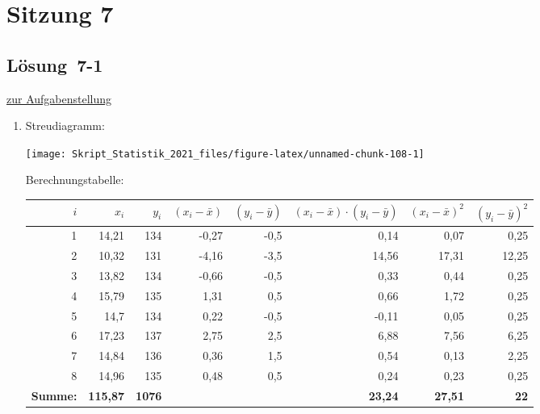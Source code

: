 \documentclass[
  11pt,
  ngerman,
  a4paper,
]{report}
\begin{document}
\hypertarget{sitzung-7}{%
\section*{Sitzung 7}\label{sitzung-7}}

\hypertarget{loesung-7-1}{%
\subsection{Lösung~7-1}\label{loesung-7-1}}

\protect\hyperlink{aufgabe-7-1}{zur Aufgabenstellung}

\begin{enumerate}
\def\labelenumi{\alph{enumi})}
\item
  Streudiagramm:

  \begin{center}\texttt{[image: Skript\_Statistik\_2021\_files/figure-latex/unnamed-chunk-108-1]} \end{center}

  Berechnungstabelle:

  \begin{table}[H]
   \centering
   \begin{tabular}{rrrrrrrr}
   \toprule
   \textbf{$i$} & \textbf{$x_i$} & \textbf{$y_i$} & \textbf{$(x_i-\bar{x})$} & \textbf{$(y_i-\bar{y})$} & \textbf{$(x_i-\bar{x})\cdot(y_i-\bar{y})$} & \textbf{$(x_i-\bar{x})^2$} & \textbf{$(y_i-\bar{y})^2$}\\
   \midrule
   1 & 14,21 & 134 & -0,27 & -0,5 & 0,14 & 0,07 & 0,25\\
   2 & 10,32 & 131 & -4,16 & -3,5 & 14,56 & 17,31 & 12,25\\
   3 & 13,82 & 134 & -0,66 & -0,5 & 0,33 & 0,44 & 0,25\\
   4 & 15,79 & 135 & 1,31 & 0,5 & 0,66 & 1,72 & 0,25\\
   5 & 14,7 & 134 & 0,22 & -0,5 & -0,11 & 0,05 & 0,25\\
   6 & 17,23 & 137 & 2,75 & 2,5 & 6,88 & 7,56 & 6,25\\
   7 & 14,84 & 136 & 0,36 & 1,5 & 0,54 & 0,13 & 2,25\\
   8 & 14,96 & 135 & 0,48 & 0,5 & 0,24 & 0,23 & 0,25\\
   \midrule
   \textbf{Summe:} & \textbf{115,87} & \textbf{1076} & \textbf{} & \textbf{} & \textbf{23,24} & \textbf{27,51} & \textbf{22}\\
   \bottomrule
   \end{tabular}
   \end{table}


\end{enumerate}
\end{document}
